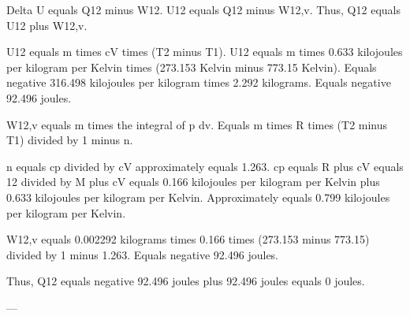 Delta U equals Q12 minus W12.  
U12 equals Q12 minus W12,v.  
Thus, Q12 equals U12 plus W12,v.  

U12 equals m times cV times (T2 minus T1).  
U12 equals m times 0.633 kilojoules per kilogram per Kelvin times (273.153 Kelvin minus 773.15 Kelvin).  
Equals negative 316.498 kilojoules per kilogram times 2.292 kilograms.  
Equals negative 92.496 joules.  

W12,v equals m times the integral of p dv.  
Equals m times R times (T2 minus T1) divided by 1 minus n.  

n equals cp divided by cV approximately equals 1.263.  
cp equals R plus cV equals 12 divided by M plus cV equals 0.166 kilojoules per kilogram per Kelvin plus 0.633 kilojoules per kilogram per Kelvin.  
Approximately equals 0.799 kilojoules per kilogram per Kelvin.  

W12,v equals 0.002292 kilograms times 0.166 times (273.153 minus 773.15) divided by 1 minus 1.263.  
Equals negative 92.496 joules.  

Thus, Q12 equals negative 92.496 joules plus 92.496 joules equals 0 joules.  

---